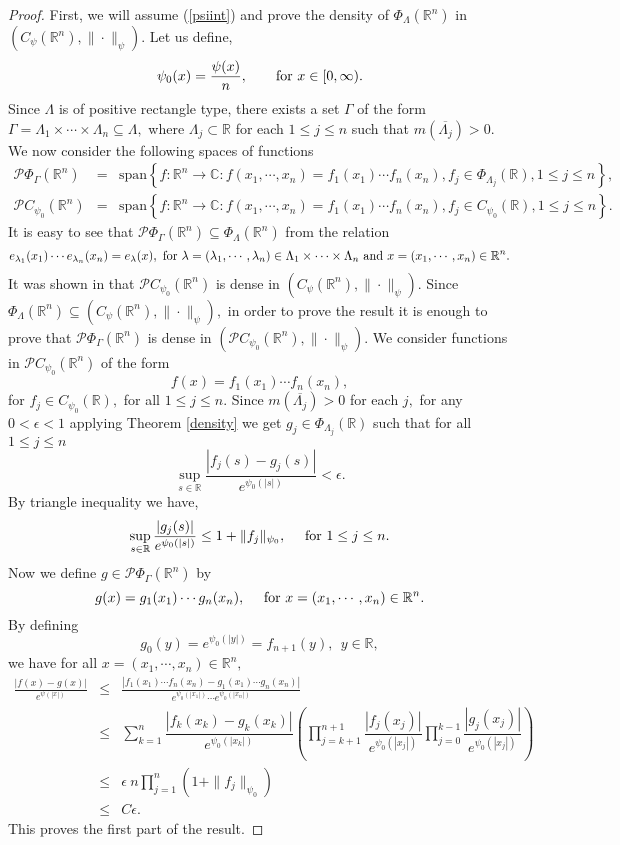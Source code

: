 \documentclass [11pt]{amsart}
\newcommand{\R}{\mathbb R}
\newcommand{\C}{\mathbb C}
\newcommand{\la}{\lambda}
\newcommand{\txt} {\textmd}
\newcommand{\beas} {\begin{eqnarray*}}
\newcommand{\eeas} {\end{eqnarray*}}
\numberwithin{equation}{section}
\begin{document}
\begin{proof} 
First, we will assume (\ref{psiint}) and prove the density of $\Phi_{\Lambda}(\R^n)$ in $(C_{\psi}(\R^n),\|\cdot \|_{\psi}).$
Let us define, 
$$\psi_0 (x)= \dfrac{\psi (x)}{n}, \quad \quad \txt{for } x\in [0,\infty).$$ 
Since $\Lambda$ is of positive rectangle type, there exists a set $\Gamma$ of the form $\Gamma = \Lambda_1 \times \cdots \times \Lambda_n \subseteq \Lambda,$ where $\Lambda_j \subset \R$ for each $1 \leq j \leq n$ such that $m(\overline{\Lambda_j})>0.$ We now consider the following spaces of functions
\beas 
\mathcal{P}\Phi_{\Gamma}(\R^n) &=& \text{span} \left\{ f:\R^n \to \C :  f(x_1, \cdots, x_n)=f_1(x_1)\cdots f_n(x_n), f_j\in \Phi_{\Lambda_j}(\R), 1\leq j \leq n  \right\},\\
\mathcal{P}C_{\psi_0}(\R^n) &=& \text{span} \left\{f:\R^n \to \C :  f(x_1, \cdots, x_n)=f_1(x_1)\cdots f_n(x_n), f_j\in C_{\psi_0}(\R), 1\leq j \leq n  \right\}. 
\eeas
It is easy to see that $\mathcal{P}\Phi_{\Gamma}(\R^n) \subseteq \Phi_{\Lambda}(\R^n)$ from the relation 
$$e_{\lambda_1}(x_1)\cdots e_{\lambda_n}(x_n)=e_{\lambda}(x), \txt{ for }\la = (\la_1, \cdots, \la_n) \in \Lambda_1 \times \cdots \times \Lambda_n \txt{ and }x = (x_1, \cdots, x_n) \in \R^n.$$ It was shown in \cite{BRS} that $ \mathcal{P}C_{\psi_0}(\R^n)$ is dense in $(C_\psi(\R^n),\|\cdot \|_\psi).$ 
Since $\Phi_{\Lambda}(\R^n) \subseteq (C_{\psi}(\R^n),\|\cdot \|_{\psi}),$ in order to prove the result it is enough to prove that $ \mathcal{P}\Phi_{\Gamma}(\R^n)$ is dense in $ (\mathcal{P}C_{\psi_0}(\R^n),\|\cdot \|_\psi).$ We consider functions in $\mathcal{P}C_{\psi_0}(\R^n)$ of the form $$f(x)= f_1(x_1)\cdots f_n(x_n),$$ for $f_j\in C_{\psi_0}(\R),$ for all $1\leq j \leq n.$ Since $m(\overline{\Lambda_j})>0$ for each $j,$ for any $0<\epsilon<1$ applying Theorem \ref{density} we get $g_j\in \Phi_{\Lambda_j}(\R)$ such that for all $1\leq j\leq n$
\begin{equation*}
\sup_{s\in \R}\frac{|f_j(s)- g_j(s)|}{e^{\psi_0(|s|)}}<\epsilon .
\end{equation*}
By triangle inequality we have,
$$ \sup_{s\in \R} \dfrac{|g_j(s)|}{e^{\psi_0(|s|)}}\leq 1+\|f_j\|_{\psi_0}, \quad \txt{ for } 1\leq j \leq n . $$ 
Now we define $g\in \mathcal{P}\Phi_{\Gamma}(\R^n)$ by $$g(x)= g_1(x_1)\cdots g_n(x_n),\quad \txt{ for }  x=(x_1, \cdots , x_n)\in \R^n.$$ By defining $$g_0(y)=e^{\psi_0(|y|)}=f_{n+1}(y),~~ y\in \R,$$ we have for all $x=(x_1,\cdots , x_n)\in \R^n,$
\begin{eqnarray*}
\frac{|f(x)- g(x)|}{e^{\psi(|x|)}} &\leq& \frac{|f_1(x_1)\cdots f_n(x_n)- g_1(x_1)\cdots g_n(x_n)|}{e^{\psi_0(|x_1|)}\cdots e^{\psi_0(|x_n|)}}\\
&\leq & \sum_{k=1}^n\dfrac{|f_k(x_k)-g_k(x_k)|}{e^{\psi_0(|x_k|)}}\left(   \prod_{j=k+1}^{n+1}\dfrac{|f_j(x_j)|}{e^{\psi_0(|x_j|)}}\prod_{j=0}^{k-1}\dfrac{|g_j(x_j)|}{e^{\psi_0(|x_j|)}} \right) \\ 
&\leq & \epsilon ~ n \prod_{j=1}^n (1+\|f_j\|_{\psi_0}) \\ 
&\leq & C\epsilon.
\end{eqnarray*}
This proves the first part of the result.


\end{proof}
\end{document}

